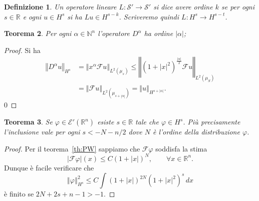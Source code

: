 \documentclass[italian,a4paper,oneside,headinclude]{scrbook}
\renewcommand{\phi}{\varphi}
\newcommand{\E}{\mathcal E}
\newcommand{\F}{\mathcal F}
\renewcommand{\S}{\mathcal S}
\newcommand{\NN}{\mathbb N}
\newcommand{\RR}{\mathbb R}
\newcommand{\abs}[1]{{\left|#1\right|}}
\newcommand{\Abs}[1]{{\left\Vert #1\right\Vert}}
\newtheorem{theorem}{Teorema}
\newtheorem{definition}[theorem]{Definizione}
\begin{document}
  \begin{definition}
    Un operatore lineare $L\colon \S' \to \S'$
    si dice avere ordine $k$ se per ogni $s\in \RR$ e ogni $u\in H^s$
    si ha $Lu\in H^{s-k}$. Scriveremo quindi $L\colon H^s \to H^{s-t}$.
  \end{definition}

  \begin{theorem}
    Per ogni $\alpha\in \NN^n$ l'operatore $D^\alpha$ ha ordine
    $\abs{\alpha}$;
  \end{theorem}
  \begin{proof}
    Si ha
    \begin{align*}
    \Abs{D^\alpha u}_{H^s}
    & = \Abs{x^\alpha \F u}_{L^2(\mu_s)}
    \le \Abs{(1+\abs{x}^2)^{\frac{ \abs{\alpha}} 2} \F u}_{L^2(\mu_S)} \\
    &= \Abs{\F u}_{L^2(\mu_{s+\abs{\alpha}})}
    = \Abs{u}_{H^{s+\abs{\alpha}}}.
    \end{align*}0
  \end{proof}

  \begin{theorem}
    Se $\phi\in \E'(\RR^n)$ esiste $s\in \RR$ tale che $\phi \in H^s$.
    Più precisamente l'inclusione vale per ogni $s<-N-n/2$ dove $N$
    è l'ordine della distribuzione $\phi$.
  \end{theorem}
  \begin{proof}
    Per il teorema~\ref{th:PW} sappiamo che $\F\phi$ soddisfa la
    stima
    \[
    \abs{\F\phi}(x) \le C(1+\abs{x})^N
    ,\qquad \forall x \in \RR^n.
    \]
    Dunque è facile verificare che
    \[
    \Abs{\phi}_{H^s}^2 \le C \int (1+\abs{x})^{2N} (1+\abs{x}^2)^s\, dx
    \]
    è finito se $2N + 2s + n-1 > -1$.
  \end{proof}
\end{document}
